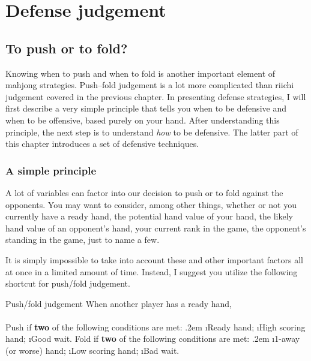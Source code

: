 
\chapter{Defense judgement} \label{ch:defense}
\thispagestyle{empty}

\section{To push or to fold?}
Knowing when to push and when to fold is another important element of mahjong strategies. Push--fold judgement is a lot more complicated than riichi judgement covered in the previous chapter. 
In presenting defense strategies, I will first describe a very simple principle that tells you when to be defensive and when to be offensive, based purely on your hand. After understanding this principle, the next step is to understand \emph{how} to be defensive. The latter part of this chapter introduces a set of defensive techniques. 

\bigskip
\subsection{A simple principle}
A lot of variables can factor into our decision to push or to fold against the opponents. You may want to consider, among other things, whether or not you currently have a ready hand, the potential hand value of your hand, the likely hand value of an opponent's hand, your current rank in the game, the opponent's standing in the game, just to name a few. 

\bigskip
It is simply impossible to take into account these and other important factors all at once in a limited amount of time. 
Instead, I suggest you utilize the following shortcut for push/fold judgement.

\begin{itembox}[c]{Push/fold judgement}
When another player has a ready hand,\\
\\
{\large Push} if {\bf two} of the following conditions are met:
\vspace{-10pt}
\be\itemsep.2em
\i Ready hand;
\i High scoring hand;
\i Good wait.
\ee
\vsps
{\large Fold} if {\bf two} of the following conditions are met:
\vspace{-10pt}
\be\itemsep.2em
\i 1-away (or worse) hand;
\i Low scoring hand;
\i Bad wait.
\ee
\end{itembox}

